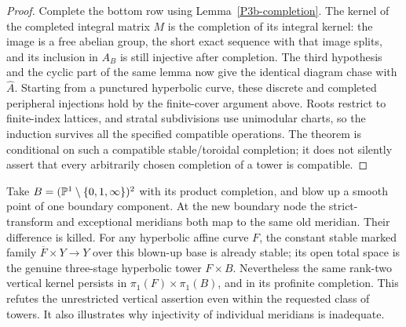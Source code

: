 \begin{proof}
Complete the bottom row using Lemma~\ref{P3b-completion}.
The kernel of the completed integral matrix $M$ is the
completion of its integral kernel: the image is a free abelian
group, the short exact sequence with that image splits, and
its inclusion in $A_B$ is still injective after completion.
The third hypothesis and the cyclic part of the same lemma
now give the identical diagram chase with $\widehat A$.
Starting from a punctured hyperbolic curve, these discrete and
completed peripheral injections hold by the finite-cover
argument above. Roots restrict to finite-index lattices, and
stratal subdivisions use unimodular charts, so the induction
survives all the specified compatible operations. The theorem
is conditional on such a compatible stable/toroidal completion;
it does not silently assert that every arbitrarily chosen
completion of a tower is compatible.
\end{proof}

\begin{example}
\label{P3b-vertical-counterexample}
Take $B=(\mathbb P^1\setminus\{0,1,\infty\})^2$ with its product
completion, and blow up a smooth point of one boundary component.
At the new boundary node the strict-transform and exceptional
meridians both map to the same old meridian. Their difference
is killed. For any hyperbolic affine curve $F$, the constant
stable marked family $\overline F\times Y\to Y$ over this
blown-up base is already stable; its open total space is the
genuine three-stage hyperbolic tower $F\times B$.
Nevertheless the same rank-two vertical kernel persists in
$\pi _1(F)\times\pi _1(B)$, and in its profinite completion.
This refutes the unrestricted vertical assertion even within
the requested class of towers. It also illustrates why
injectivity of individual meridians is inadequate.
\end{example}

